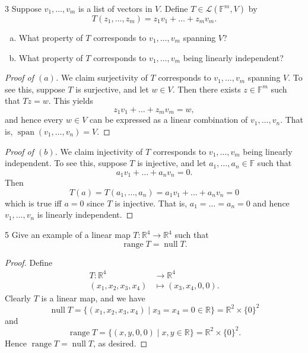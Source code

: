 \documentclass{extarticle}
\newenvironment{problem}[1]{\begin{prob*}{#1}{}}{\end{prob*}}
\newcommand{\R}{\mathbb{R}}
\newcommand{\F}{\mathbb{F}}
\DeclareMathOperator{\Span}{span}
\newcommand{\Hom}{\mathcal{L}}
\DeclareMathOperator{\Null}{null}
\DeclareMathOperator{\Range}{range}
\begin{document}
\begin{problem}{3}
Suppose $v_1,\dots,v_m$ is a list of vectors in $V$.  Define $T\in\Hom(\F^m, V)$ by
\begin{equation*}
T(z_1,\dots, z_m) = z_1v_1 + \dots + z_m v_m.
\end{equation*}
\begin{enumerate}[(a)]
\item What property of $T$ corresponds to $v_1,\dots, v_m$ spanning $V$?
\item What property of $T$ corresponds to $v_1,\dots, v_m$ being linearly independent?
\end{enumerate}
\end{problem}
\begin{proof}[Proof of $(a)$]
We claim surjectivity of $T$ corresponds to $v_1,\dots, v_m$ spanning $V$.  To see this, suppose $T$ is surjective, and let $w\in V$.  Then there exists $z\in \F^m$ such that $Tz = w$.  This yields 
\begin{equation*}
z_1v_1 + \dots + z_m v_m = w,
\end{equation*}
and hence every $w\in V$ can be expressed as a linear combination of $v_1,\dots, v_n$.  That is, $\Span(v_1,\dots,v_n)= V$.
\end{proof}
\begin{proof}[Proof of $(b)$]
We claim injectivity of $T$ corresponds to $v_1,\dots, v_m$ being linearly independent.  To see this, suppose $T$ is injective, and let $a_1,\dots, a_n\in\F$ such that 
\begin{equation*}
a_1v_1 + \dots + a_nv_n = 0.
\end{equation*}
Then 
\begin{equation*}
T(a) = T(a_1,\dots, a_n) = a_1v_1 + \dots + a_nv_n = 0
\end{equation*}
which is true iff $a = 0$ since $T$ is injective.  That is, $a_1=\dots = a_n=0$ and hence $v_1,\dots, v_n$ is linearly independent. 
\end{proof}

\begin{problem}{5}
Give an example of a linear map $T:\R^4\to\R^4$ such that 
\begin{equation*}
\Range T = \Null T.
\end{equation*}
\end{problem}
\begin{proof}
Define
\begin{align*}
T: \R^4 &\to \R^4\\
(x_1,x_2,x_3,x_4) &\mapsto (x_3, x_4, 0, 0).
\end{align*}
Clearly $T$ is a linear map, and we have
\begin{equation*}
\Null T =\{(x_1, x_2, x_3, x_4)\mid x_3 = x_4 = 0\in\R\} = \R^2\times \{0\}^2
\end{equation*}
and 
\begin{equation*}
\Range T = \{(x, y, 0, 0)\mid x, y\in\R\} = \R^2 \times \{0\}^2.
\end{equation*}
Hence $\Range T = \Null T$, as desired.
\end{proof}
\end{document}
